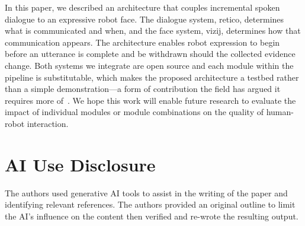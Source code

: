 \documentclass[conference]{IEEEtran}
\begin{document}
In this paper, we described an architecture that couples incremental spoken dialogue to
an expressive robot face. The dialogue system, retico, determines what is communicated
and when, and the face system, vizij, determines how that communication appears. The architecture enables robot expression to begin
before an utterance is complete and be withdrawn should the collected evidence change.
Both systems we integrate are open source and each module within the pipeline is substitutable, which makes the proposed architecture a testbed rather than a simple demonstration---a form of
contribution the field has argued it requires more
of~\cite{gunes2022reproducibility}. We hope this work will enable future research to evaluate the impact of individual modules or module combinations on the quality of human-robot interaction.

\section{AI Use Disclosure}
The authors used generative AI tools to assist in the writing of the paper and identifying relevant references. The authors provided an original outline to limit the AI's influence on the content then verified and re-wrote the resulting output.



\end{document}
